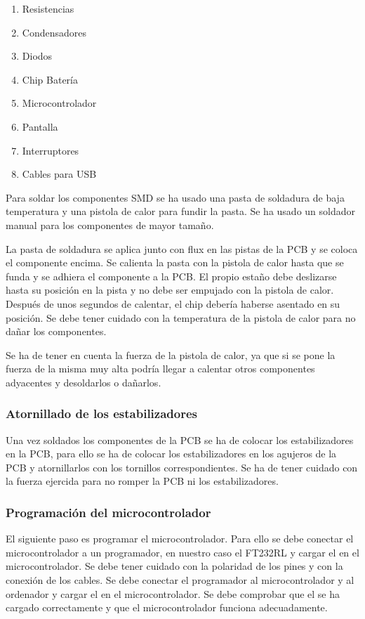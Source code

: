 \begin{enumerate}
    \item Resistencias
    \item Condensadores
    \item Diodos
    \item Chip Batería
    \item Microcontrolador
    \item Pantalla
    \item Interruptores
    \item Cables para \gls{USB}
\end{enumerate}

Para soldar los componentes \gls{SMD} se ha usado una pasta de soldadura de baja temperatura y una pistola de calor para fundir la pasta. Se ha usado un soldador manual para los componentes de mayor tamaño.

La pasta de soldadura se aplica junto con flux en las pistas de la \gls{PCB} y se coloca el componente encima. Se calienta la pasta con la pistola de calor hasta que se funda y se adhiera el componente a la \gls{PCB}. El propio estaño debe deslizarse hasta su posición en la pista y no debe ser empujado con la pistola de calor. Después de unos segundos de calentar, el chip debería haberse asentado en su posición. Se debe tener cuidado con la temperatura de la pistola de calor para no dañar los componentes.

Se ha de tener en cuenta la fuerza de la pistola de calor, ya que si se pone la fuerza de la misma muy alta podría llegar a calentar otros componentes adyacentes y desoldarlos o dañarlos. \cite{SoldaduraSMD}

\subsubsection{Atornillado de los estabilizadores}
Una vez soldados los componentes de la \gls{PCB} se ha de colocar los estabilizadores en la \gls{PCB}, para ello se ha de colocar los estabilizadores en los agujeros de la \gls{PCB} y atornillarlos con los tornillos correspondientes. Se ha de tener cuidado con la fuerza ejercida para no romper la \gls{PCB} ni los estabilizadores.

\subsubsection{Programación del microcontrolador}
El siguiente paso es programar el microcontrolador. Para ello se debe conectar el microcontrolador a un programador, en nuestro caso el FT232RL y cargar el  en el microcontrolador. Se debe tener cuidado con la polaridad de los pines y con la conexión de los cables. Se debe conectar el programador al microcontrolador y al ordenador y cargar el  en el microcontrolador. Se debe comprobar que el  se ha cargado correctamente y que el microcontrolador funciona adecuadamente.

